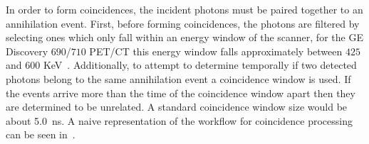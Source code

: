                 In order to form coincidences, the incident photons must be paired together to an annihilation event. First, before forming coincidences, the photons are filtered by selecting ones which only fall within an energy window of the scanner, for the \gls{GE} Discovery $690$/$710$ \gls{PET}/\gls{CT} this energy window falls approximately between $425$ and $600$ \gls{KeV}~\parencite{Bettinardi2011}. Additionally, to attempt to determine temporally if two detected photons belong to the same annihilation event a coincidence window is used. If the events arrive more than the time of the coincidence window apart then they are determined to be unrelated. A standard coincidence window size would be about \SI{5.0}{\nano\second}. A naive representation of the workflow for coincidence processing can be seen in~.
            
